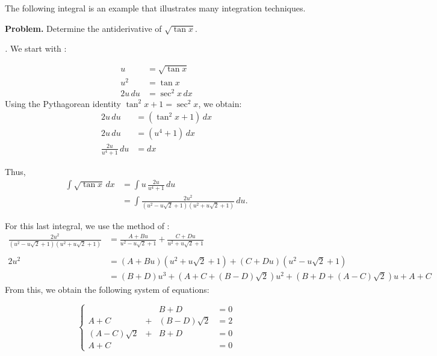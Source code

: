 \documentclass[12pt]{article}
\begin{document}

The following integral is an example that illustrates many integration techniques.

\textbf{Problem.} Determine the antiderivative of $\sqrt{\tan x}$.

\emph{.}  We start with :

\begin{align*}
u & =\sqrt{\tan x} \\
u^2 & =\tan x \\
2u \, du & =\sec^2 x \, dx
\end{align*}
Using the Pythagorean identity $\tan^2 x+1=\sec^2 x$, we obtain:
\begin{align*}
2u \, du & =(\tan^2 x+1) \, dx \\
2u \, du & =(u^4+1) \, dx \\
\frac{2u}{u^4+1} \, du & =dx
\end{align*}

Thus,
\begin{align*}
\int\sqrt{\tan x} \, dx & =\int u\,\frac{2u}{u^4+1} \, du \\
& =\int\frac{2u^2}{(u^2-u\sqrt{2}+1)(u^2+u\sqrt{2}+1)} \, du.
\end{align*}

For this last integral, we use the method of :
\begin{align*}
\frac{2u^2}{(u^2-u\sqrt{2}+1)(u^2+u\sqrt{2}+1)} & =\frac{A+Bu}{u^2-u\sqrt{2}+1}+\frac{C+Du}{u^2+u\sqrt{2}+1} \\ \\
2u^2 & =(A+Bu)(u^2+u\sqrt{2}+1)+(C+Du)(u^2-u\sqrt{2}+1) \\
& =(B\!+\!D)u^3+(A\!+\!C\!+\!(B\!-\!D)\sqrt{2})u^2+(B\!+\!D\!+\!(A\!-\!C)\sqrt{2})u+A\!+\!C
\end{align*}
From this, we obtain the following system of equations:

\[
\left\{
\begin{array}{cccc}
              &   & B+D           & =0 \\
A+C           & + & (B-D)\sqrt{2} & =2 \\
(A-C)\sqrt{2} & + & B+D           & =0 \\
A+C           &   &               & =0
\end{array}
\right.
\]
\end{document}

